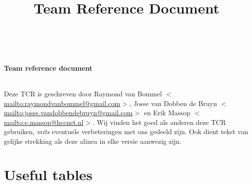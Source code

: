 \documentclass[10pt,a4paper,titlepage]{article}
\title{Team Reference Document}
\author{ \\ }
\begin{document}
   \begin{center}
      \Large\textbf{Team reference document}\\
      \Large\textit{ \\ }
   \end{center}


\begin{multicols}{2}
\tableofcontents
\end{multicols}

Deze TCR is geschreven door Raymond van Bommel $<$\url{mailto:raymondvanbommel@gmail.com}$>$, Josse van Dobben de Bruyn $<$\url{mailto:josse.vandobbendebruyn@gmail.com}$>$ en Erik Massop $<$\url{mailto:e.massop@hccnet.nl}$>$. Wij vinden het goed als anderen deze TCR gebruiken, \emph{mits} eventuele verbeteringen met ons gedeeld zijn. Ook dient tekst van gelijke strekking als deze alinea in elke versie aanwezig zijn.

\pagebreak
\section{Useful tables}
\end{document}
